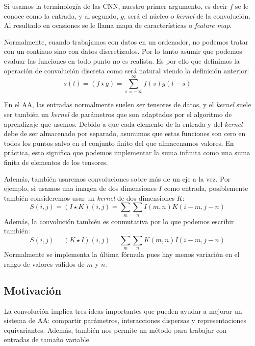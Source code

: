 Si usamos la terminología de las \ac{CNN}, nuestro primer argumento, es decir $f$ se le conoce como la entrada, y al segundo, $g$, será el núcleo o \textit{kernel} de la convolución. Al resultado en ocasiones se le llama mapa de características o \textit{feature map}.

Normalmente, cuando trabajamos con datos en un ordenador, no podemos tratar con un continuo sino con datos discretizados. Por lo tanto asumir que podemos evaluar las funciones en todo punto no es realista. Es por ello que definimos la operación de convolución discreta como será natural viendo la definición anterior:
\begin{equation}
    s(t) = (f \star g) = \sum_{s=-\infty}^{\infty}f(s)g(t-s)
\end{equation}

En el \ac{AA}, las entradas normalmente suelen ser tensores de datos, y el \textit{kernel} suele ser también un \textit{kernel} de parámetros que son adaptados por el algoritmo de aprendizaje que usemos. Debido a que cada elemento de la entrada y del \textit{kernel} debe de ser almacenado por separado, asumimos que estas funciones son cero en todos los puntos salvo en el conjunto finito del que almacenamos valores. En práctica, esto significa que podemos implementar la suma infinita como una suma finita de elementos de los tensores.

Además, también usaremos convoluciones sobre más de un eje a la vez. Por ejemplo, si usamos una imagen de dos dimensiones $I$ como entrada, posiblemente también consideremos usar un \textit{kernel} de dos dimensiones $K$:
\begin{equation}
    S(i,j) = (I \star K)(i,j) = \sum_m \sum_n I(m,n)K(i-m, j-n)
\end{equation}
Además, la convolución también es conmutativa por lo que podemos escribir también:
\begin{equation}
    S(i,j) = (K \star I)(i,j) = \sum_m \sum_n K(m,n)I(i-m, j-n)
\end{equation}
Normalmente se implementa la última fórmula pues hay menos variación en el rango de valores válidos de $m$ y $n$.

\subsection{Motivación}
La convolución implica tres ideas importantes que pueden ayudar a mejorar un sistema de \ac{AA}: compartir parámetros, interacciones dispersas y representaciones equivariantes. Además, también nos permite un método para trabajar con entradas de tamaño variable.

